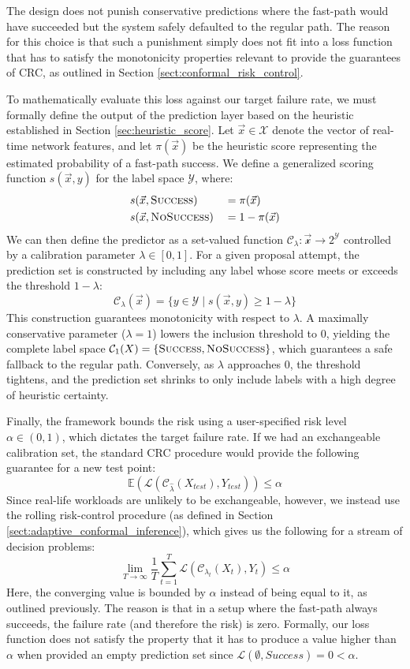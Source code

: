 The design does not punish conservative predictions where the fast-path would have succeeded but the system safely defaulted to the regular path. The reason for this choice is that such a punishment simply does not fit into a loss function that has to satisfy the monotonicity properties relevant to provide the guarantees of \gls{CRC}, as outlined in Section \ref{sect:conformal_risk_control}.

To mathematically evaluate this loss against our target failure rate, we must formally define the output of the prediction layer based on the heuristic established in Section \ref{sec:heuristic_score}. Let $\vec{x} \in \mathcal{X}$ denote the vector of real-time network features, and let $\pi(\vec{x})$ be the heuristic score representing the estimated probability of a fast-path success. We define a generalized scoring function $s(\vec{x}, y)$ for the label space $\mathcal{Y}$, where:
\begin{alignat*}{2}
&s(\vec{x}, \textsc{Success}) &&= \pi(\vec{x})\\
&s(\vec{x}, \textsc{NoSuccess}) &&= 1 - \pi(\vec{x})
\end{alignat*}
We can then define the predictor as a set-valued function $\mathcal{C}_\lambda: \mathcal{\vec{x}} \rightarrow 2^{\mathcal{Y}}$ controlled by a calibration parameter $\lambda \in [0, 1]$. For a given proposal attempt, the prediction set is constructed by including any label whose score meets or exceeds the threshold $1 - \lambda$:
$$\mathcal{C}_\lambda(\vec{x}) = \{ y \in \mathcal{Y} \mid s(\vec{x}, y) \ge 1 - \lambda \}$$
This construction guarantees monotonicity with respect to $\lambda$. A maximally conservative parameter ($\lambda = 1$) lowers the inclusion threshold to $0$, yielding the complete label space $\mathcal{C}_1(X) = \{\textsc{Success}, \textsc{NoSuccess}\}$, which guarantees a safe fallback to the regular path. Conversely, as $\lambda$ approaches $0$, the threshold tightens, and the prediction set shrinks to only include labels with a high degree of heuristic certainty. 

Finally, the framework bounds the risk using a user-specified risk level $\alpha \in (0, 1)$, which dictates the target failure rate. If we had an exchangeable calibration set, the standard \gls{CRC} procedure would provide the following guarantee for a new test point:
$$\mathbb{E}(\mathcal{L}(\mathcal{C}_{\widehat\lambda}(X_{test}), Y_{test})) \le \alpha$$
Since real-life workloads are unlikely to be exchangeable, however, we instead use the rolling risk-control procedure (as defined in Section \ref{sect:adaptive_conformal_inference}), which gives us the following for a stream of decision problems:
$$\lim_{T \to \infty} \frac{1}{T} \sum_{t=1}^T \mathcal{L}(\mathcal{C}_{\lambda_t}(X_t), Y_t) \le \alpha$$
Here, the converging value is bounded by $\alpha$ instead of being equal to it, as outlined previously. The reason is that in a setup where the fast-path always succeeds, the failure rate (and therefore the risk) is zero. Formally, our loss function does not satisfy the property that it has to produce a value higher than $\alpha$ when provided an empty prediction set since $\mathcal{L}(\emptyset, Success) = 0 < \alpha$.


